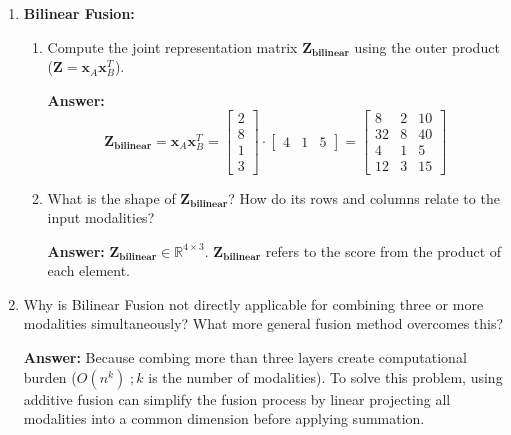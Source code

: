 \documentclass[11pt]{article}
\begin{document}
\begin{enumerate}[label=(\alph*)]
\begin{enumerate}[label=\arabic*.]
\begin{enumerate}[label=(\alph*)]
            \textbf{Answer:} \(\mathbf{z_\text{add}} = \mathbf{W}_A \mathbf{x}_A + \mathbf{W}_B \mathbf{x}_B \in \mathbb{R}^2\)
        \end{enumerate}

        \item \textbf{Bilinear Fusion:}
        \begin{enumerate}[label=(\alph*)]
            \item Compute the joint representation matrix \(\mathbf{Z_\text{bilinear}}\) using the outer product (\(\mathbf{Z} = \mathbf{x}_A \mathbf{x}^T_B\)).
            
            \textbf{Answer:} 
            \[
                \mathbf{Z_\text{bilinear}} 
                = \mathbf{x}_A \mathbf{x}^T_B 
                = \begin{bmatrix} 2 \\ 8 \\ 1 \\ 3 \end{bmatrix} \cdot \begin{bmatrix} 4 & 1 & 5 \end{bmatrix} 
                = \begin{bmatrix}
                    8 & 2 & 10 \\ 
                    32 & 8 & 40 \\
                    4 & 1 & 5 \\ 
                    12 & 3 & 15
                \end{bmatrix}
            \]

            \item What is the shape of \(\mathbf{Z_\text{bilinear}}\)? How do its rows and columns relate to the input modalities?
            
            \textbf{Answer:} \(\mathbf{Z_\text{bilinear}} \in \mathbb{R}^{4 \times 3}\). \(\mathbf{Z_\text{bilinear}}\) refers to the score from the product of each element.
        \end{enumerate}

        \item Why is Bilinear Fusion not directly applicable for combining three or more modalities simultaneously?
        What more general fusion method overcomes this?

        \textbf{Answer:} Because combing more than three layers create computational burden (\(O(n^k) \; ; k\) is the number of modalities).
        To solve this problem, using additive fusion can simplify the fusion process by linear projecting all modalities into a common dimension before applying summation.

    \end{enumerate}

\end{enumerate}
\end{document}
